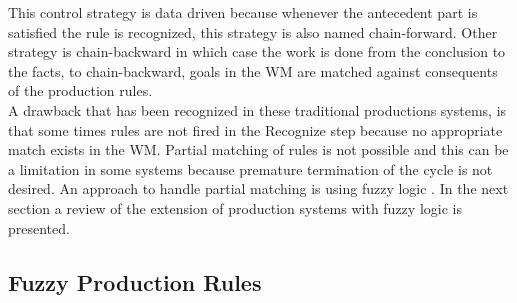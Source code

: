This control strategy is data driven because whenever the antecedent
part is satisfied the rule is recognized, this strategy is also named
chain-forward. Other strategy is chain-backward in which case the work
is done from the conclusion to the facts, to chain-backward, goals in
the WM are matched against consequents of the production
rules.\\A drawback that has been recognized in these traditional
productions systems, is that some times rules are not fired in the
Recognize step because no appropriate match exists in the WM. Partial
matching of rules is not possible and this can be a limitation in some
systems because premature termination of the cycle is not desired. An
approach to handle partial matching is using fuzzy logic
\cite{konar2006computational}. In the next section a review of the
extension of production systems with fuzzy logic is presented.\\

\subsection{Fuzzy Production Rules}

